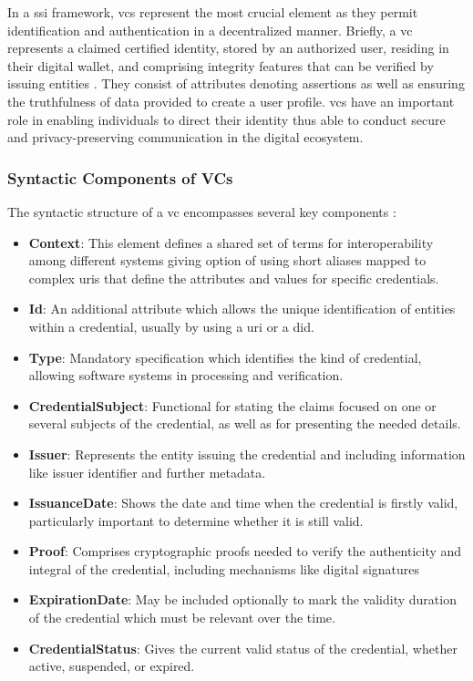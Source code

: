 In a \gls{ssi} framework, \gls{vc}s represent the most crucial element as they permit identification and authentication in a 
decentralized manner. Briefly, a \gls{vc} represents a claimed certified identity, stored by an authorized user, residing in their digital wallet, and comprising integrity 
features that can be verified by issuing entities \cite{9333857}. They consist of attributes denoting assertions as well as ensuring the truthfulness of data provided to create a user 
profile. \gls{vc}s have an important role in enabling individuals to direct their identity thus able to conduct secure and privacy-preserving communication in the digital ecosystem.

\subsubsection{Syntactic Components of VCs}

The syntactic structure of a \gls{vc} encompasses several key components \cite{w3cvcdatamodel}:

\begin{itemize}
  \item \textbf{Context}: This element defines a shared set of terms for interoperability among different systems giving option of using short aliases mapped to complex 
  \gls{uri}s that define the attributes and values for specific credentials.
  \item \textbf{Id}: An additional attribute which allows the unique identification of entities within a credential, usually by using a \gls{uri} or a \gls{did}.
  \item \textbf{Type}: Mandatory specification which identifies the kind of credential, allowing software systems in processing and verification.
  \item \textbf{CredentialSubject}: Functional for stating the claims focused on one or several subjects of the credential, as well as for presenting the needed details.
  \item \textbf{Issuer}: Represents the entity issuing the credential and including information like issuer identifier and further metadata.
  \item \textbf{IssuanceDate}: Shows the date and time when the credential is firstly valid, particularly important to determine whether it is still valid.
  \item \textbf{Proof}: Comprises cryptographic proofs needed to verify the authenticity and integral of the credential, including mechanisms like digital signatures
  \item \textbf{ExpirationDate}: May be included optionally to mark the validity duration of the credential which must be relevant over the time.
  \item \textbf{CredentialStatus}: Gives the current valid status of the credential, whether active, suspended, or expired.
\end{itemize}

